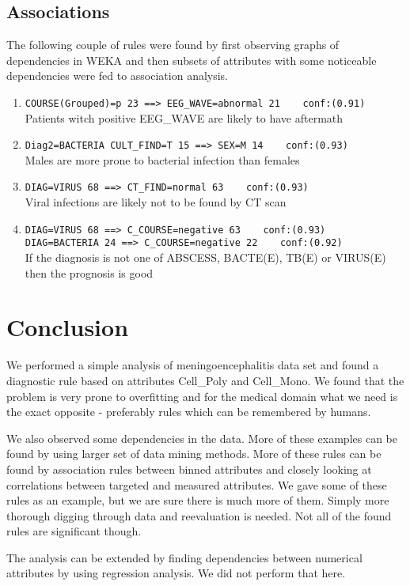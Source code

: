 \documentclass[11pt]{article}
\begin{document}
\subsection{Associations}
The following couple of rules were found by first observing graphs of
dependencies in WEKA and then subsets of attributes with some noticeable
dependencies were fed to association analysis.
\begin{enumerate}
    \item \verb|COURSE(Grouped)=p 23 ==> EEG_WAVE=abnormal 21    conf:(0.91)| \\
          Patients witch positive EEG\_WAVE are likely to have aftermath
    \item \verb|Diag2=BACTERIA CULT_FIND=T 15 ==> SEX=M 14    conf:(0.93)| \\
          Males are more prone to bacterial infection than females
    \item \verb|DIAG=VIRUS 68 ==> CT_FIND=normal 63    conf:(0.93)| \\
          Viral infections are likely not to be found by CT scan
      \item \verb|DIAG=VIRUS 68 ==> C_COURSE=negative 63    conf:(0.93)| \\
          \verb|DIAG=BACTERIA 24 ==> C_COURSE=negative 22    conf:(0.92)| \\
          If the diagnosis is not one of ABSCESS, BACTE(E), TB(E) or VIRUS(E)
          then the prognosis is good

\end{enumerate}

\section{Conclusion}
We performed a simple analysis of meningoencephalitis data set and found a
diagnostic rule based on attributes Cell\_Poly and Cell\_Mono. We found that
the problem is very prone to overfitting and for the medical domain what we
need is the exact opposite - preferably rules which can be remembered by
humans. 

We also observed some dependencies in the data. More of these examples can be
found by using larger set of data mining methods.  More of these rules can be
found by association rules between binned attributes and closely looking at
correlations between targeted and measured attributes. We gave some of these
rules as an example, but we are sure there is much more of them. Simply more
thorough digging through data and reevaluation is needed. Not all of the found
rules are significant though.

The analysis can be extended by finding dependencies between numerical
attributes by using regression analysis. We did not perform that here.








% 



\end{document}
